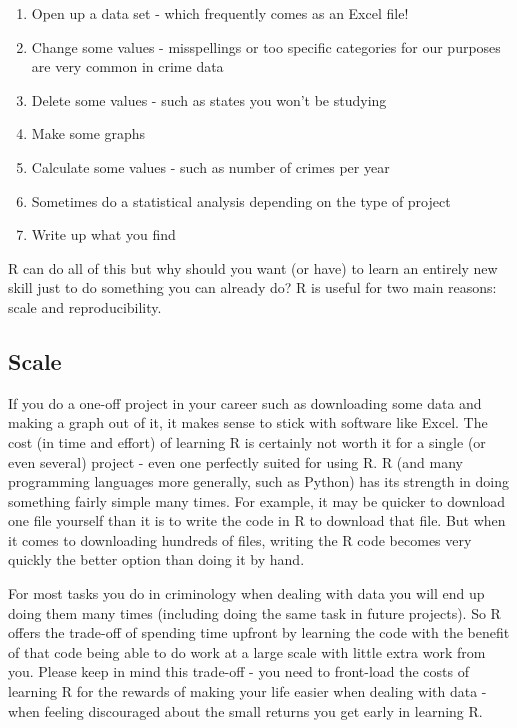 \documentclass[
]{krantz}
\providecommand{\tightlist}{%
  \setlength{\itemsep}{0pt}\setlength{\parskip}{0pt}}
\begin{document}
\begin{enumerate}
\def\labelenumi{\arabic{enumi}.}
\tightlist
\item
  Open up a data set - which frequently comes as an Excel file!
\item
  Change some values - misspellings or too specific categories for our purposes are very common in crime data
\item
  Delete some values - such as states you won't be studying
\item
  Make some graphs
\item
  Calculate some values - such as number of crimes per year
\item
  Sometimes do a statistical analysis depending on the type of project
\item
  Write up what you find
\end{enumerate}

R can do all of this but why should you want (or have) to learn an entirely new skill just to do something you can already do? R is useful for two main reasons: scale and reproducibility.

\hypertarget{scale}{%
\subsection{Scale}\label{scale}}

If you do a one-off project in your career such as downloading some data and making a graph out of it, it makes sense to stick with software like Excel. The cost (in time and effort) of learning R is certainly not worth it for a single (or even several) project - even one perfectly suited for using R. R (and many programming languages more generally, such as Python) has its strength in doing something fairly simple many times. For example, it may be quicker to download one file yourself than it is to write the code in R to download that file. But when it comes to downloading hundreds of files, writing the R code becomes very quickly the better option than doing it by hand.

For most tasks you do in criminology when dealing with data you will end up doing them many times (including doing the same task in future projects). So R offers the trade-off of spending time upfront by learning the code with the benefit of that code being able to do work at a large scale with little extra work from you. Please keep in mind this trade-off - you need to front-load the costs of learning R for the rewards of making your life easier when dealing with data - when feeling discouraged about the small returns you get early in learning R.
\end{document}
